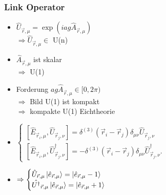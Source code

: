 \documentclass{beamer}
\begin{document}
\begin{frame}
	\frametitle{Link Operator}
	\begin{itemize}
		\item $\hat{U}_{\vec{r}, \mu}=\exp{(iag\hat{A}_{\vec{r}, \mu})}$\\
		      $\Rightarrow\hat{U}_{\vec{r}, \mu}\in$ U(n)
		\item $\hat{A}_{\vec{r}, \mu}$ ist skalar\\
		      $\Rightarrow$ U(1)
		\item Forderung $ag\hat{A}_{\vec{r}, \mu}\in[0,2\pi)$\\
		      $\Rightarrow$ Bild U(1) ist kompakt\\
		      $\Rightarrow$ kompakte U(1) Eichtheorie
		\item $\begin{cases}
				      [\hat{E}_{\vec{r}_{i}, \mu}, \hat{U}_{\vec{r}_{j}, \nu}]      =\delta^{(3)}(\vec{r}_{i}-\vec{r}_{j})\delta_{\mu\nu}\hat{U}_{\vec{r}_{j}, \nu} \\
				      [\hat{E}_{\vec{r}_{i}, \mu}, \hat{U}_{\vec{r}_{j}, \nu}^\dag] =-\delta^{(3)}(\vec{r}_{i}-\vec{r}_{j})\delta_{\mu\nu}\hat{U}_{\vec{r}_{j}, \nu}^{\dag}.
			      \end{cases}$
		\item $\Rightarrow\begin{cases}
				      \hat{U}_{\vec{r}, \mu}\ket{\hat{e}_{\vec{r}, \mu}}=\ket{\hat{e}_{\vec{r}, \mu}-1} \\
				      \hat{U^\dag}_{\vec{r}, \mu}\ket{\hat{e}_{\vec{r}, \mu}}=\ket{\hat{e}_{\vec{r}, \mu}+1}
			      \end{cases}$
	\end{itemize}

\end{frame}
\end{document}
